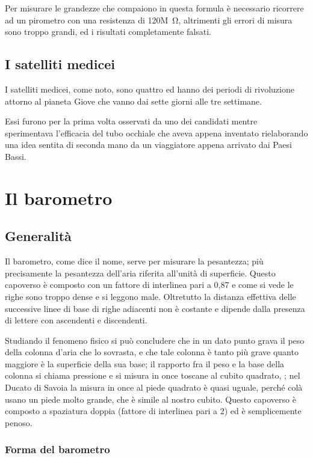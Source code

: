 \documentclass[%
12pt,
twoside,
]{toptesi}
\begin{document}
Per misurare le grandezze che compaiono in questa formula è necessario
ricorrere ad un pirometro con una resistenza di 120\unit{M\ohm}, altrimenti gli
errori di misura sono troppo grandi, ed i risultati completamente falsati.

\section{I satelliti medicei}
I satelliti medicei, come noto, sono quattro ed hanno dei periodi di rivoluzione
attorno al pianeta Giove che vanno dai sette giorni alle tre settimane.

Essi furono per la prima volta osservati da uno dei candidati mentre
sperimentava l'efficacia del tubo occhiale che aveva appena inventato
rielaborando una idea sentita di seconda mano da un viaggiatore appena arrivato
dai Paesi Bassi.
\chapter{Il barometro}
\section{Generalità}
\begin{interlinea}{0.87} Il barometro, come dice il nome, serve per
misurare la pesantezza; più precisamente la pesantezza dell'aria
riferita all'unità di superficie. Questo capoverso è composto con un fattore di interlinea pari a 0,87 e come si vede le righe sono troppo dense e si leggono male. Oltretutto la distanza effettiva delle successive linee di base di righe adiacenti non è costante e dipende dalla presenza di lettere con ascendenti e discendenti.
\end{interlinea}

\begin{interlinea}{2} Studiando il fenomeno fisico si può concludere
che in un dato punto grava il peso della colonna d'aria che lo
sovrasta, e che tale colonna è tanto più grave quanto maggiore
è la superficie della sua base; il rapporto fra il peso e la base
della colonna si chiama pressione e si misura in once toscane al cubito
quadrato, \cite{tor1}; nel Ducato di Savoia la misura in once al piede
quadrato è quasi uguale, perché colà usano un piede molto
grande, che è simile al nostro cubito. Questo capoverso è composto a spaziatura doppia (fattore di interlinea pari a 2) ed è semplicemente penoso.
\end{interlinea}

\subsection{Forma del barometro}
\end{document}

